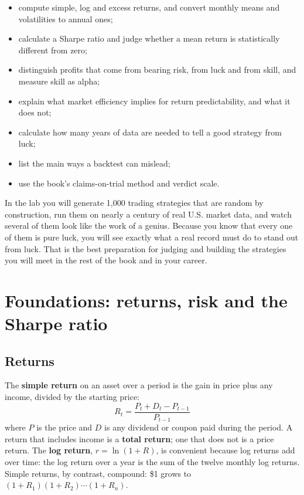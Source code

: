 \begin{itemize}
  \item compute simple, log and excess returns, and convert monthly means and volatilities to annual ones;
  \item calculate a Sharpe ratio and judge whether a mean return is statistically different from zero;
  \item distinguish profits that come from bearing risk, from luck and from skill, and measure skill as alpha;
  \item explain what market efficiency implies for return predictability, and what it does not;
  \item calculate how many years of data are needed to tell a good strategy from luck;
  \item list the main ways a backtest can mislead;
  \item use the book's claims-on-trial method and verdict scale.
\end{itemize}

In the lab you will generate 1,000 trading strategies that are random by construction, run them on nearly a century of real U.S. market data, and watch several of them look like the work of a genius. Because you know that every one of them is pure luck, you will see exactly what a real record must do to stand out from luck. That is the best preparation for judging and building the strategies you will meet in the rest of the book and in your career.

\section{Foundations: returns, risk and the Sharpe ratio}
\label{sec:01-foundations}

\subsection{Returns}

The \textbf{simple return} on an asset over a period is the gain in price plus any income, divided by the starting price:
\begin{equation}
  R_t = \frac{P_t + D_t - P_{t-1}}{P_{t-1}}
  \label{eq:01-return}
\end{equation}
where $P$ is the price and $D$ is any dividend or coupon paid during the period. A return that includes income is a \textbf{total return}; one that does not is a price return. The \textbf{log return}, $r = \ln(1 + R)$, is convenient because log returns add over time: the log return over a year is the sum of the twelve monthly log returns. Simple returns, by contrast, compound: \$1 grows to $(1 + R_1)(1 + R_2)\cdots(1 + R_n)$.

